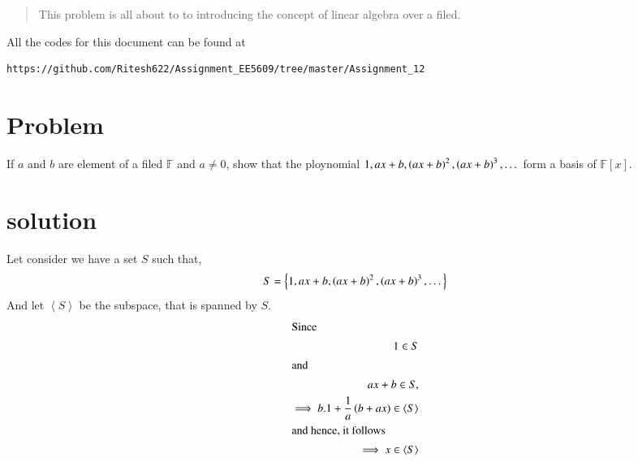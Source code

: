 \documentclass[journal,12pt,twocolumn]{IEEEtran}
\begin{document}
	
	\maketitle
	\newpage
	\bigskip
	\renewcommand{\thefigure}{\theenumi}
	\renewcommand{\thetable}{\theenumi}
	\date{Today}
	

\begin{abstract}
This problem is all about to to introducing the concept of linear algebra over a filed.
\end{abstract}
All the codes for this document can be found at
\begin{lstlisting}
https://github.com/Ritesh622/Assignment_EE5609/tree/master/Assignment_12
\end{lstlisting}
\section{Problem}
If $a$ and $b$ are element of a filed $\mathbb{F}$ and $ a \neq 0$, show that the ploynomial $ 1, ax+b, \left(ax+b\right)^2, \left(ax+b\right)^3,  \dots $ form a basis of $\mathbb{F}[x].$
\section{solution}
 Let consider we have a set $S$ such that,
 \begin{align}
 S = \left \{    1, ax+b, \left(ax+b\right)^2, \left(ax+b\right)^3,  \dots  \right \}
 \end{align}
 And let $\left \langle S \right \rangle$ be the subspace, that is spanned by $S$.
 \begin{align}
 \intertext{Since}
  1 \in S\\
 \intertext{and}
  ax+b \in S,\\
  \implies  b.1 + \frac{1}{a}\left(b +ax\right) \in \left \langle S \right \rangle \\
  \intertext{and hence, it follows}
   \implies x \in \left \langle S \right \rangle 
 \end{align}
 
\end{document}
